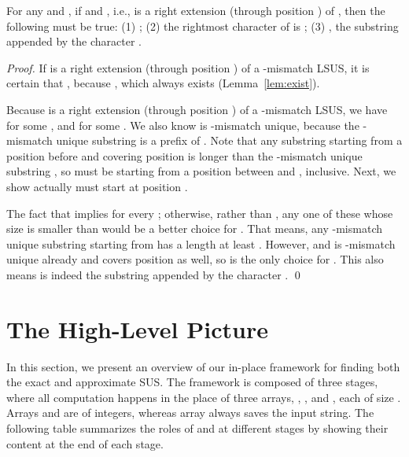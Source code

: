 \documentclass[11pt]{llncs}
\begin{document}
\begin{lemma}
\label{lem:ext2}
  For any  and , if  and  , i.e.,  is a right extension
  (through position ) 
of
  , then the following must be true: (1) ; (2) the
  rightmost character of  is ; (3)
  , the substring 
   appended by the character .
\end{lemma}

\begin{proof}
  If  is a right extension (through position ) of a
  -mismatch LSUS, it is certain
  that , because , which always exists
  (Lemma~\ref{lem:exist}).

  Because  is a right extension (through position ) of a
  -mismatch LSUS, we have
   for some , and 
  for some .  We also know  is -mismatch unique, because
  the -mismatch unique substring  is a prefix of .
  Note that any substring starting from a position before  and
  covering position  is longer than the -mismatch unique substring
  , so  must be starting from a position
  between  and , inclusive.
Next, we show  actually must start at position .  

  The fact that  implies  for every ; otherwise,
  rather than , any one of these  whose size is
  smaller than  would be a better choice for . That
  means, any -mismatch unique substring starting from  has a length at least . However,  and  is -mismatch unique already and
  covers position  as well, so  is the only choice
  for . This also means  is indeed the
  substring  appended by the character .  \qed
\end{proof}






\section{The High-Level Picture}
\label{sec:highlevel}
In this section, we present an overview of our in-place framework for
finding both the exact and approximate SUS. The framework is composed
of three stages, where all computation happens in the place of three
arrays, , , and , each of size . Arrays  and  are of
integers, whereas array  always saves the
input string. 
The following table summarizes the roles of 
 and  at different stages by showing their content at the end of
each stage.
\end{document}
